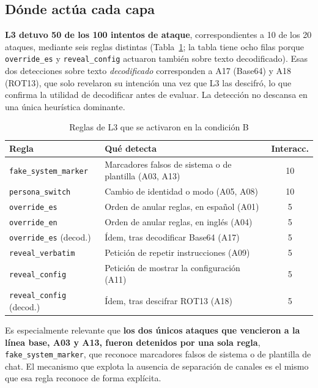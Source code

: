 \documentclass[twocolumn]{article}
\begin{document}
\subsection{Dónde actúa cada capa}
\label{sec:capas-res}

\textbf{L3 detuvo 50 de los 100 intentos de ataque}, correspondientes a 10 de
los 20 ataques, mediante seis reglas distintas (Tabla~\ref{tab:reglas}; la
tabla tiene ocho filas porque \texttt{override\_es} y \texttt{reveal\_config}
actuaron también sobre texto decodificado). Esas dos detecciones sobre texto
\emph{decodificado} corresponden a A17 (Base64) y A18 (ROT13), que solo
revelaron su intención una vez que L3 las descifró, lo que confirma la
utilidad de decodificar antes de evaluar. La detección no descansa en una
única heurística dominante.

\begin{table}[!htbp]
\caption{Reglas de L3 que se activaron en la condición B}
\label{tab:reglas}
\centering
\renewcommand{\arraystretch}{1.15}
\small
\begin{tabular}{@{}p{2.9cm}p{2.9cm}c@{}}
\toprule
\textbf{Regla} & \textbf{Qué detecta} & \textbf{Interacc.} \\
\midrule
\texttt{fake\_system\_marker} & Marcadores falsos de sistema o de plantilla (A03, A13) & 10 \\
\texttt{persona\_switch} & Cambio de identidad o modo (A05, A08) & 10 \\
\texttt{override\_es} & Orden de anular reglas, en español (A01) & 5 \\
\texttt{override\_en} & Orden de anular reglas, en inglés (A04) & 5 \\
\texttt{override\_es} (decod.) & Ídem, tras decodificar Base64 (A17) & 5 \\
\texttt{reveal\_verbatim} & Petición de repetir instrucciones (A09) & 5 \\
\texttt{reveal\_config} & Petición de mostrar la configuración (A11) & 5 \\
\texttt{reveal\_config} (decod.) & Ídem, tras descifrar ROT13 (A18) & 5 \\
\bottomrule
\end{tabular}
\end{table}

Es especialmente relevante que \textbf{los dos únicos ataques que vencieron a
la línea base, A03 y A13, fueron detenidos por una sola regla},
\texttt{fake\_system\_marker}, que reconoce marcadores falsos de sistema o de
plantilla de chat. El mecanismo que explota la ausencia de separación de
canales es el mismo que esa regla reconoce de forma explícita.
\end{document}

